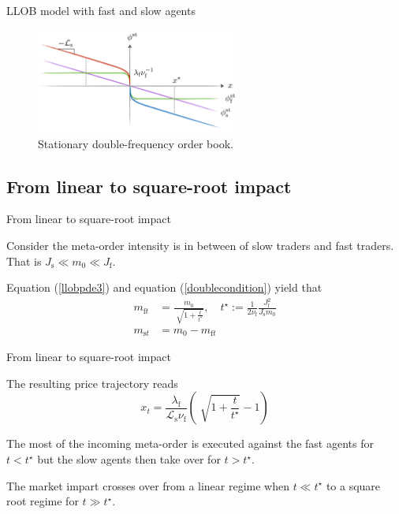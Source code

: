 \documentclass{beamer}
\begin{document}
\begin{frame}{LLOB model with fast and slow agents}

\begin{figure}
\centering
\includegraphics[width=0.6\textwidth]{figure3.PNG}
\caption{\label{fig:f3}Stationary double-frequency order book.}
\end{figure}

\end{frame}

\subsection{From linear to square-root impact}

\begin{frame}{From linear to square-root impact}

Consider the meta-order intensity is in between of slow traders and fast traders. That is $J_\text{s}\ll m_0\ll J_\text{f}$. \newline

Equation (\ref{llobpde3}) and equation (\ref{doublecondition}) yield that
\begin{equation}
\begin{split}
m_{\text{f}t} &= \frac{m_0}{\sqrt[]{1+\frac{t}{t^\star}}},\quad t^\star:=\frac{1}{2\nu_\text{f}}\frac{J_\text{f}^2}{J_\text{s}m_0} \\
m_{\text{s}t} &= m_0-m_{\text{f}t}
\end{split}
\end{equation}

\end{frame}

\begin{frame}{From linear to square-root impact}

The resulting price trajectory reads
\begin{equation}
x_t=\frac{\lambda_\text{f}}{\mathcal{L}_\text{s}\nu_\text{f}}\left(\sqrt[]{1+\frac{t}{t^\star}}-1\right)
\end{equation}

The most of the incoming meta-order is executed against the fast agents for $t<t^\star$ but the slow agents then take over for $t>t^\star$. \newline

The market impart crosses over from a linear regime when $t\ll t^\star$ to a square root regime for $t\gg t^\star$.

\end{frame}
\end{document}
